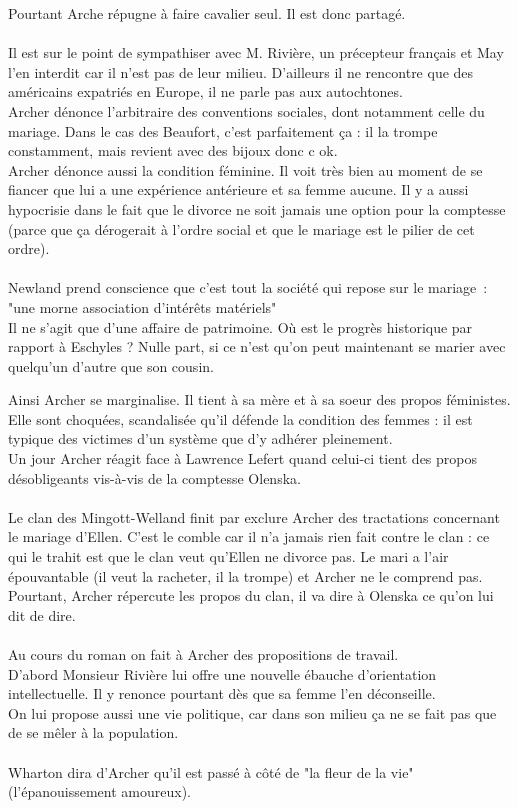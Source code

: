 \documentclass[a4paper,12pt]{article}
\begin{document}
Pourtant Arche répugne à faire cavalier seul. Il est donc partagé.\\\\

Il est sur le point de sympathiser avec M. Rivière, un précepteur français et May l'en interdit car il n'est pas de leur milieu. D'ailleurs il ne rencontre que des américains expatriés en Europe, il ne parle pas aux autochtones.\\
Archer dénonce l'arbitraire des conventions sociales, dont notamment celle du mariage. Dans le cas des Beaufort, c'est parfaitement ça : il la trompe constamment, mais revient avec des bijoux donc c ok.\\
Archer dénonce aussi la condition féminine. Il voit très bien au moment de se fiancer que lui a une expérience antérieure et sa femme aucune. Il y a aussi hypocrisie dans le fait que le divorce ne soit jamais une option pour la comptesse (parce que ça dérogerait à l'ordre social et que le mariage est le pilier de cet ordre).\\\\
Newland prend conscience que c'est tout la société qui repose sur le mariage~:\\
"une morne association d'intérêts matériels"\\
Il ne s'agit que d'une affaire de patrimoine. Où est le progrès historique par rapport à Eschyles ? Nulle part, si ce n'est qu'on peut maintenant se marier avec quelqu'un d'autre que son cousin.

Ainsi Archer se marginalise. Il tient à sa mère et à sa soeur des propos féministes. Elle sont choquées, scandalisée qu'il défende la condition des femmes : il est typique des victimes d'un système que d'y adhérer pleinement.\\
Un jour Archer réagit face à Lawrence Lefert quand celui-ci tient des propos désobligeants vis-à-vis de la comptesse Olenska.\\\\
Le clan des Mingott-Welland finit par exclure Archer des tractations concernant le mariage d'Ellen. C'est le comble car il n'a jamais rien fait contre le clan : ce qui le trahit est que le clan veut qu'Ellen ne divorce pas. Le mari a l'air épouvantable (il veut la racheter, il la trompe) et Archer ne le comprend pas. Pourtant, Archer répercute les propos du clan, il va dire à Olenska ce qu'on lui dit de dire.\\\\
Au cours du roman on fait à Archer des propositions de travail.\\
D'abord Monsieur Rivière lui offre une nouvelle ébauche d'orientation intellectuelle. Il y renonce pourtant dès que sa femme l'en déconseille.\\
On lui propose aussi une vie politique, car dans son milieu ça ne se fait pas que de se mêler à la population.\\\\
Wharton dira d'Archer qu'il est passé à côté de "la fleur de la vie" (l'épanouissement amoureux).
\end{document}
